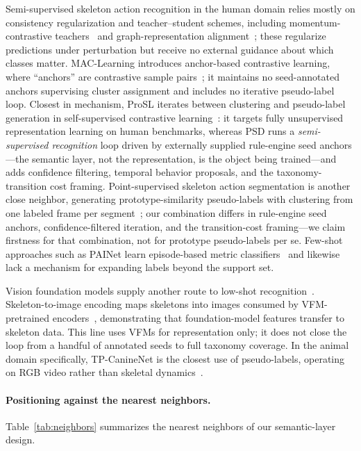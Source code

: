 Semi-supervised skeleton action recognition in the human domain relies mostly on consistency regularization and teacher--student schemes, including momentum-contrastive teachers~\citep{mct2024tip} and graph-representation alignment~\citep{gra2024tnnls}; these regularize predictions under perturbation but receive no external guidance about which classes matter. MAC-Learning introduces anchor-based contrastive learning, where ``anchors'' are contrastive sample pairs~\citep{mac2022learning}; it maintains no seed-annotated anchors supervising cluster assignment and includes no iterative pseudo-label loop. Closest in mechanism, ProSL iterates between clustering and pseudo-label generation in self-supervised contrastive learning~\citep{qin2025prosl}: it targets fully unsupervised representation learning on human benchmarks, whereas PSD runs a \emph{semi-supervised recognition} loop driven by externally supplied rule-engine seed anchors---the semantic layer, not the representation, is the object being trained---and adds confidence filtering, temporal behavior proposals, and the taxonomy-transition cost framing. Point-supervised skeleton action segmentation is another close neighbor, generating prototype-similarity pseudo-labels with clustering from one labeled frame per segment~\citep{pointsup2026}; our combination differs in rule-engine seed anchors, confidence-filtered iteration, and the transition-cost framing---we claim firstness for that combination, not for prototype pseudo-labels per se. Few-shot approaches such as PAINet learn episode-based metric classifiers~\citep{painet2023} and likewise lack a mechanism for expanding labels beyond the support set.

Vision foundation models supply another route to low-shot recognition~\citep{caron2021dino}. Skeleton-to-image encoding maps skeletons into images consumed by VFM-pretrained encoders~\citep{skel2img2026}, demonstrating that foundation-model features transfer to skeleton data. This line uses VFMs for representation only; it does not close the loop from a handful of annotated seeds to full taxonomy coverage. In the animal domain specifically, TP-CanineNet is the closest use of pseudo-labels, operating on RGB video rather than skeletal dynamics~\citep{tpcanine2025}.

\paragraph{Positioning against the nearest neighbors.}
Table~\ref{tab:neighbors} summarizes the nearest neighbors of our semantic-layer design.

